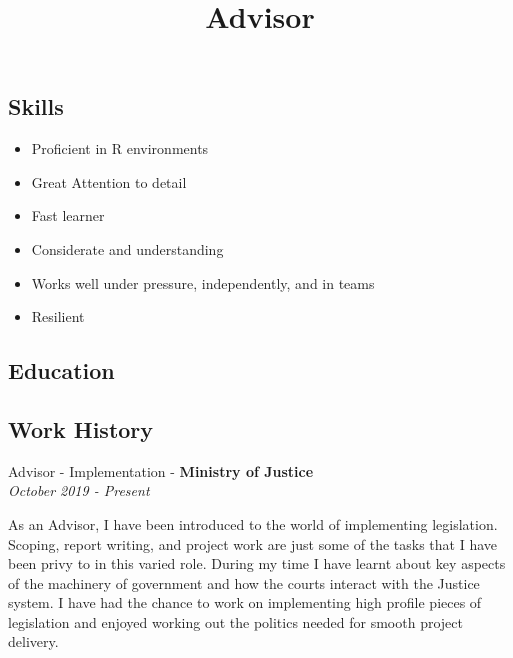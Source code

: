 \documentclass[11pt,a4paper,]{moderncv}
\title{Advisor}
\begin{document}
\makecvtitle



\hypertarget{skills}{%
\subsection{Skills}\label{skills}}

\begin{itemize}
\item
  Proficient in R environments ~
\item
  Great Attention to detail ~
\item
  Fast learner\\
\item
  Considerate and understanding\\
\item
  Works well under pressure, independently, and in teams ~
\item
  Resilient ~
\end{itemize}

\hypertarget{education}{%
\subsection{Education}\label{education}}

\nopagebreak

\hypertarget{work-history}{%
\subsection{Work History}\label{work-history}}

Advisor - Implementation - \textbf{Ministry of Justice}\\

\emph{October 2019 - Present}

As an Advisor, I have been introduced to the world of implementing
legislation. Scoping, report writing, and project work are just some of
the tasks that I have been privy to in this varied role. During my time
I have learnt about key aspects of the machinery of government and how
the courts interact with the Justice system. I have had the chance to
work on implementing high profile pieces of legislation and enjoyed
working out the politics needed for smooth project delivery.
\end{document}
